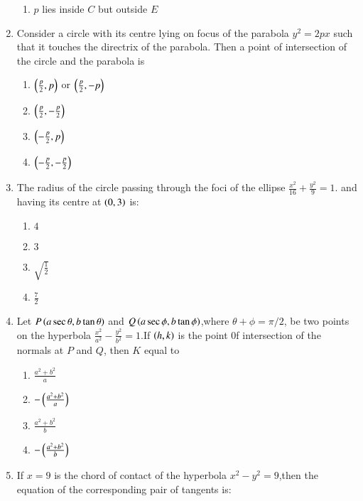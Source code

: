 \documentclass[journal,12pt,twocolumn]{IEEEtran}
\theoremstyle{remark}
\begin{document}
\begin{enumerate}
\begin{enumerate}
    \item $p$ lies inside $C$ but outside $E$ \\
\end{enumerate}
\item Consider a circle with its centre lying on focus of the parabola $y^2=2px$ such that it touches the directrix of the parabola. Then a point of intersection of the circle and the parabola is\hfill{}\\
\begin{enumerate}
    \item $\left(\frac{p}{2},p\right)$ or $\left(\frac{p}{2},-p\right)$
    \item $\left(\frac{p}{2},-\frac{p}{2}\right)$
    \item $\left(-\frac{p}{2},p\right)$
    \item $\left(-\frac{p}{2},-\frac{p}{2}\right)$\\
\end{enumerate}
\item The radius of the circle passing through the foci of the ellipse $\frac{x^2}{16}+\frac{y^2}{9}=1$. and having its centre at $\left(0,3\right)$ is:\hfill {}
\begin{enumerate}
    \item $4$
    \item $3$
    \item $\sqrt{\frac{1}{2}}$
    \item $\frac{7}{2}$\\
\end{enumerate}
\item Let $P\left(a\sec\theta,b\tan\theta\right)$ and $Q\left(a\sec\phi,b\tan \phi\right)$,where $\theta+\phi=\pi/2$, be two points on the hyperbola $\frac{x^2}{a^2}-\frac{y^2}{b^2}=1$.If $\left(h,k\right)$ is the point 0f intersection of the normals at $P$ and $Q$, then $K$ equal to \hfill {}\\
\begin{enumerate}
    \item $\frac{a^2+b^2}{a}$
    \item $-\left(\frac{a^2+b^2}{a}\right)$
    \item $\frac{a^2+b^2}{b}$
    \item $-\left(\frac{a^2+b^2}{b}\right)$\\
\end{enumerate}
\item If $x=9$ is the chord of contact of the hyperbola $x^2-y^2=9$,then the equation of the corresponding pair of tangents is:
\hfill {}\\

\end{enumerate}
\end{document}
